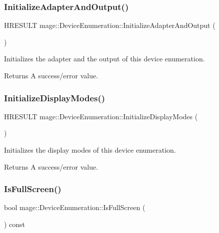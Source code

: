 \subsubsection{\texorpdfstring{Initialize\+Adapter\+And\+Output()}{InitializeAdapterAndOutput()}}
{\footnotesize\ttfamily H\+R\+E\+S\+U\+LT mage\+::\+Device\+Enumeration\+::\+Initialize\+Adapter\+And\+Output (\begin{DoxyParamCaption}{ }\end{DoxyParamCaption})\hspace{0.3cm}{\ttfamily [protected]}}

Initializes the adapter and the output of this device enumeration.

\begin{DoxyReturn}{Returns}
A success/error value. 
\end{DoxyReturn}
\hypertarget{classmage_1_1_device_enumeration_ac4644c68492b919362e21f2e47fbad93}{}\label{classmage_1_1_device_enumeration_ac4644c68492b919362e21f2e47fbad93} 
\subsubsection{\texorpdfstring{Initialize\+Display\+Modes()}{InitializeDisplayModes()}}
{\footnotesize\ttfamily H\+R\+E\+S\+U\+LT mage\+::\+Device\+Enumeration\+::\+Initialize\+Display\+Modes (\begin{DoxyParamCaption}{ }\end{DoxyParamCaption})\hspace{0.3cm}{\ttfamily [protected]}}

Initializes the display modes of this device enumeration.

\begin{DoxyReturn}{Returns}
A success/error value. 
\end{DoxyReturn}
\hypertarget{classmage_1_1_device_enumeration_a8957ecacc567708e80694b25aa141c4e}{}\label{classmage_1_1_device_enumeration_a8957ecacc567708e80694b25aa141c4e} 
\subsubsection{\texorpdfstring{Is\+Full\+Screen()}{IsFullScreen()}}
{\footnotesize\ttfamily bool mage\+::\+Device\+Enumeration\+::\+Is\+Full\+Screen (\begin{DoxyParamCaption}{ }\end{DoxyParamCaption}) const}

